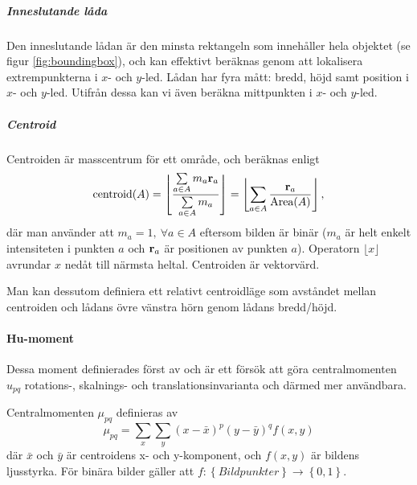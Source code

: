 \documentclass[../rapport_MVEX01-11-05]{subfiles}
\begin{document}
\subparagraph{Inneslutande låda}

Den inneslutande lådan är den minsta rektangeln som innehåller hela
objektet (se figur \ref{fig:boundingbox}),
och kan effektivt beräknas genom att lokalisera
extrempunkterna i $x$- och $y$-led. Lådan har fyra mått: bredd, höjd samt
position i $x$- och $y$-led. Utifrån dessa kan vi även beräkna
mittpunkten i $x$- och $y$-led.

\subparagraph{Centroid}

Centroiden är masscentrum för ett område, och beräknas enligt
\begin{equation*}
  \textrm{centroid}(A) = \left\lfloor\frac{
    \sum\limits_{a\in A}m_a\mathbf{r}_a
  }{
    \sum\limits_{a\in A}m_a
  }\right\rfloor =
  \left\lfloor\sum\limits_{a\in
  A}\frac{\mathbf{r}_a}{\textrm{Area}(A)}\right\rfloor,
\end{equation*}
där man använder att $m_a=1,\:\forall a\in A$ eftersom bilden är
binär ($m_a$ är helt enkelt intensiteten i punkten $a$ och
$\mathbf{r}_a$ är positionen av punkten $a$). Operatorn $\lfloor
x\rfloor$ avrundar $x$ nedåt till närmsta heltal. Centroiden är vektorvärd.

Man kan dessutom definiera ett relativt centroidläge  som avståndet mellan centroiden
och lådans övre vänstra hörn genom lådans bredd/höjd.

\paragraph{Hu-moment}

Dessa moment definierades först av  och är ett försök att
göra centralmomenten $u_{pq}$ rotations-, skalnings- och translationsinvarianta och
därmed mer användbara. 

Centralmomenten $\mu_{pq}$ definieras av
\begin{equation*}
	\mu_{pq} = \sum\limits_x\sum\limits_y
	           \left(x-\bar{x}\right)^p
	           \left(y-\bar{y}\right)^q
	           f(x,y)
\end{equation*}
där $\bar{x}$ och $\bar{y}$ är centroidens x- och y-komponent, och $f(x,y)$ är
bildens ljusstyrka. För binära bilder gäller att
$f:\left\{Bildpunkter\right\}\rightarrow\left\{0,1\right\}$.
\end{document}
